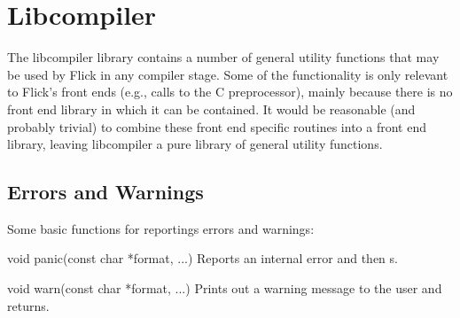 

\chapter{Libcompiler}
\label{cha:libcompiler}

The libcompiler library contains a number of general utility functions that may
be used by Flick in any compiler stage.  Some of the functionality is only
relevant to Flick's front ends (e.g., calls to the C preprocessor), mainly
because there is no front end library in which it can be contained.  It would
be reasonable (and probably trivial) to combine these front end specific
routines into a front end library, leaving libcompiler a pure library of
general utility functions.



\section{Errors and Warnings}
\label{sec:libcompiler:Errors and Warnings}

Some basic functions for reportings errors and warnings:

\begin{cprototypelist}
  \item[void panic(const char *format, ...)] Reports an internal
  error and then s.

  \item[void warn(const char *format, ...)] Prints out a warning
  message to the user and returns.
\end{cprototypelist}

